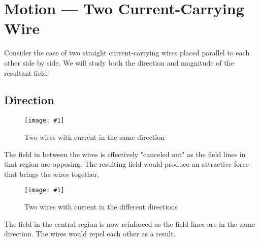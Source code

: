 \documentclass[a4paper,12pt]{article}
\let\oldsection\section
\renewcommand\section{\clearpage\oldsection}
\newcommand{\img}[4]{\begin{center}
  \begin{figure}[H]
    \centering
    \texttt{[image: \#1]}
    \caption{#3}
    \label{fig:#4}
  \end{figure}
\end{center}}
\begin{document}
\section{Motion --- Two Current-Carrying Wire}

Consider the case of two straight current-carrying wires placed parallel to each other side by side. We will study both the direction and magnitude of the resultant field.

\subsection{Direction}

\begin{minipage}{0.45\textwidth}
  \img{twowirecases/samedir.png}{1}{Two wires with current in the same direction}{samedir}

  The field in between the wires is effectively "canceled out" as the field lines in that region are opposing. The resulting field would produce an attractive force that brings the wires together.
\end{minipage}\hspace*{0.1\textwidth}
\begin{minipage}{0.45\textwidth}
  \img{twowirecases/diffdir.png}{1}{Two wires with current in the different directions}{diffdir}

  The field in the central region is now reinforced as the field lines are in the same direction. The wires would repel each other as a result.\\
\end{minipage}
\end{document}
